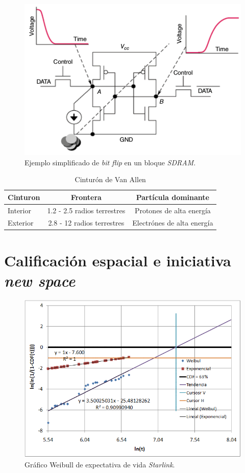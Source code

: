 \begin{figure}[htbp]
	\centering
	\includegraphics[width=.8\textwidth]{./Figures/bitflip.jpg}
    \caption{Ejemplo simplificado de \emph{bit flip} en un bloque \emph{SDRAM}\citep{WEBSITE:effects_on_devices}.}
	\label{fig:bitflip}
\end{figure}

\begin{table}[h]
	\centering
	\caption[Cinturón de Van Allen]{Cinturón de Van Allen\citep{WEBSITE:structure_space_radiation}}
	\begin{tabular}{l c c}    
		\toprule
		\textbf{Cinturon} & \textbf{Frontera}           & \textbf{Partícula dominante}\\
		\midrule
		Interior          & 1.2 - 2.5 radios terrestres & Protones de alta energía\\		
		Exterior          & 2.8 - 12 radios terrestres  & Electrónes de alta energía\\
		\bottomrule
		\hline
	\end{tabular}
	\label{tab:capasmagneticas}
\end{table}

\section{Calificación espacial e iniciativa \emph{new space}}
\label{sec:newspace}

\begin{figure}[htbp]
	\centering
	\includegraphics[width=.8\textwidth]{./Figures/starlinkdeath.png}
    \caption{Gráfico Weibull de expectativa de vida \emph{Starlink}\citep{ARTICLE:cibils}.}
	\label{fig:starlinkdeath}
\end{figure}

